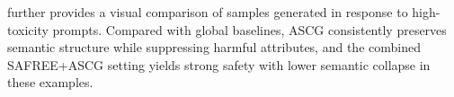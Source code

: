  further provides a visual comparison of samples generated in response to high-toxicity prompts.
Compared with global baselines, ASCG consistently preserves semantic structure while suppressing harmful attributes, and the combined SAFREE+ASCG setting yields strong safety with lower semantic collapse in these examples.







